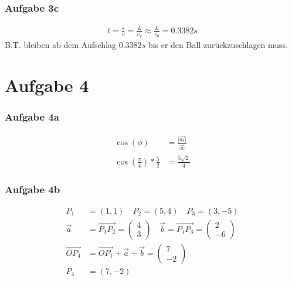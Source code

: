 \documentclass[a4paper,11pt]{article}
\begin{document}
      \subsubsection*{Aufgabe 3c}
        \begin{align*}
          t=\frac{s}{v}=\frac{L}{v_x}\approx\frac{L}{v_0}=0.3382s
        \end{align*}
        B.T. bleiben ab dem Aufschlag $0.3382s$ bis er den Ball zurückzuschlagen muss.
\section*{Aufgabe 4}
  \subsubsection*{Aufgabe 4a}
    \begin{align*}
      \cos(\phi)&=\frac{\vert\vec{a_b}\vert}{\vert\vec{a}\vert} \\
      \cos\left(\frac{\pi}{4}\right)*\frac{5}{2}&=\frac{5\sqrt{2}}{4}
    \end{align*}
    
  \subsubsection*{Aufgabe 4b}
    \begin{align*}
      P_1&=(1,1) \quad P_2=(5,4) \quad P_3=(3,-5) \\
      \vec{a}&=\overrightarrow{P_1P_2}=\begin{pmatrix}4\\3\end{pmatrix} \quad \vec{b}=\overrightarrow{P_1P_3}=\begin{pmatrix}2\\-6\end{pmatrix} \\
      \overrightarrow{OP_4}&=\overrightarrow{OP_1}+\vec{a}+\vec{b}=\begin{pmatrix}7\\-2\end{pmatrix} \\
      P_4&=(7,-2)
    \end{align*}
    
\end{document}
